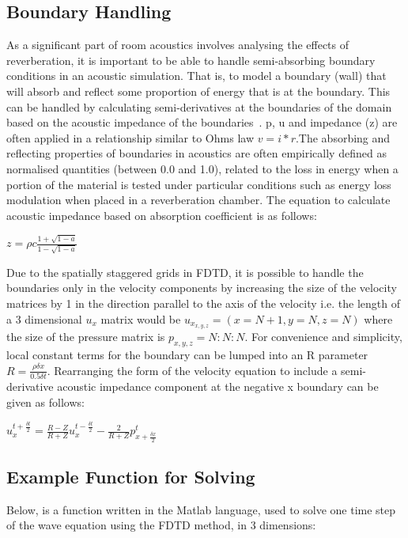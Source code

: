 \subsection{Boundary Handling}
As a significant part of room acoustics involves analysing the effects of reverberation, it is important to be able to handle semi-absorbing boundary conditions in an acoustic simulation. That is, to model a boundary (wall) that will absorb and reflect some proportion of energy that is at the boundary. This can be handled by calculating semi-derivatives at the boundaries of the domain based on the acoustic impedance of the boundaries~\cite{Olesen1997}\cite{Hill2012}. p, u and impedance (z) are often applied in a relationship similar to Ohms law $v = i * r $.The absorbing and reflecting properties of boundaries in acoustics are often empirically defined as normalised quantities (between 0.0 and 1.0), related to the loss in energy when a portion of the material is tested under particular conditions such as energy loss modulation when placed in a reverberation chamber. The equation to calculate acoustic impedance based on absorption coefficient is as follows:\\
\begin{center}
$z = \rho c \frac{1 + \sqrt{1 - a}}{1 - \sqrt{1 - a}} $\\
\end{center}
Due to the spatially staggered grids in FDTD, it is possible to handle the boundaries only in the velocity components by increasing the size of the  velocity matrices by 1 in the direction parallel to the axis of the velocity i.e. the length of a 3 dimensional $u_x$ matrix would be $u_{x_{x,y,z}} = (x = N+1, y = N, z = N)$ where the size of the pressure matrix is $p_{x,y,z} = N:N:N$. For convenience and simplicity, local constant terms for the boundary can  be lumped into an R parameter $R = \frac{\rho \delta x}{0.5 \delta t}$. Rearranging the form of the velocity equation to include a semi-derivative acoustic impedance component at the negative x boundary can be given as follows:\\
\begin{center}
$ u^{t + \frac{\delta t}{2}}_{x} = \frac{R - Z}{R + Z} u^{t - \frac{\delta t}{2}}_{x} - \frac{2}{R + Z} p^{t}_{x+ \frac{\delta x}{2}} $\\
\end{center}

\subsection{Example Function for Solving}
Below, is a function written in the Matlab \textregistered language, used to solve one time step of the wave equation using the FDTD method, in 3 dimensions:


